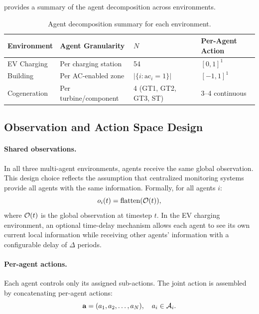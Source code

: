  provides a summary of the agent decomposition across environments.

\begin{table}[htbp]
\centering
\caption{Agent decomposition summary for each environment.}
\label{tab:agent_decomposition}
\begin{tabular}{@{}llll@{}}
\toprule
\textbf{Environment} & \textbf{Agent Granularity} & \textbf{$N$} & \textbf{Per-Agent Action} \\
\midrule
EV Charging & Per charging station & 54 & $[0,1]^1$ \\
Building & Per AC-enabled zone & $|\{i: \text{ac}_i=1\}|$ & $[-1,1]^1$ \\
Cogeneration & Per turbine/component & 4 (GT1, GT2, GT3, ST) & 3--4 continuous \\
\bottomrule
\end{tabular}
\end{table}

\subsection{Observation and Action Space Design}
\label{sec:marl_obs_act}

\paragraph{Shared observations.} In all three multi-agent environments, agents receive the same global observation. This design choice reflects the assumption that centralized monitoring systems provide all agents with the same information. Formally, for all agents $i$:
\begin{equation}
    o_i(t) = \text{flatten}(\mathcal{O}(t)),
\end{equation}
where $\mathcal{O}(t)$ is the global observation at timestep $t$. In the EV charging environment, an optional time-delay mechanism allows each agent to see its own current local information while receiving other agents' information with a configurable delay of $\Delta$ periods.

\paragraph{Per-agent actions.} Each agent controls only its assigned sub-actions. The joint action is assembled by concatenating per-agent actions:
\begin{equation}
    \mathbf{a} = (a_1, a_2, \ldots, a_N), \quad a_i \in \mathcal{A}_i.
\end{equation}

